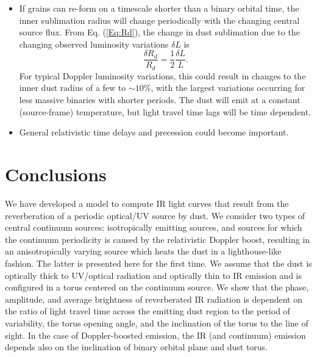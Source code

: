\begin{itemize}
 \item If grains can re-form on a timescale shorter than a binary orbital
time, the inner   sublimation radius will change periodically with the
changing central source flux. From Eq. (\ref{Eq:Rd}), the change in dust
sublimation due to the changing observed luminosity variations $\delta L$ is
 \begin{equation}
 \frac{\delta R_d}{R_d} = \frac{1}{2} \frac{\delta L}{L}.
 \end{equation}
For typical Doppler luminosity variations, this could result in changes to the
inner dust radius of a few to $\sim 10 \%$, with the largest variations
occurring for less massive binaries with shorter periods. The dust will emit at a
constant (source-frame) temperature, but light travel time lags will be time
dependent.


\item General relativistic time delays and precession could become important.%


\end{itemize}


\section{Conclusions}
\label{S:conclusions}

We have developed a model to compute IR light curves that result from the
reverberation of a periodic optical/UV source by dust. We consider two types
of central continuum sources: isotropically emitting sources, and sources for
which the continuum periodicity is caused by the relativistic Doppler boost,
resulting in an anisotropically varying source which heats the dust in a
lighthouse-like fashion. The latter is presented here for the first time. We
assume that the dust is optically thick to UV/optical radiation and optically
thin to IR emission and is configured in a torus centered on the continuum
source. We show that the phase, amplitude, and average brightness of
reverberated IR radiation is dependent on the ratio of light travel time
across the emitting dust region to the period of variability, the torus
opening angle, and the inclination of the torus to the line of sight. In the
case of Doppler-boosted emission, the IR (and continuum) emission depends also
on the inclination of binary orbital plane and dust torus.



